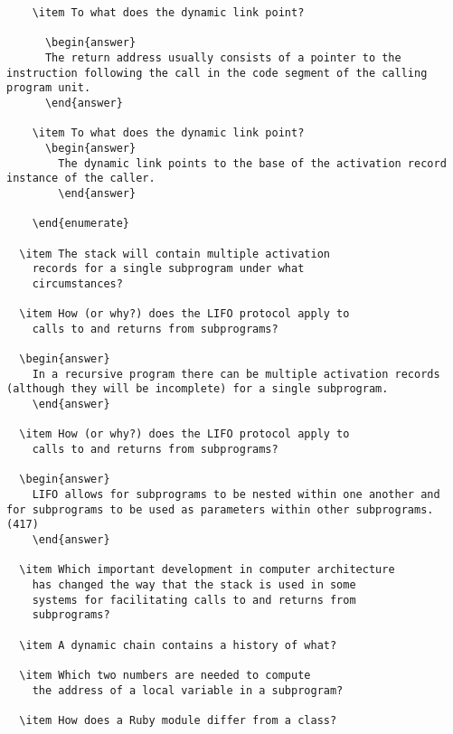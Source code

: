 \begin{enumerate}
\begin{answer}
\begin{lstlisting}
    \item To what does the dynamic link point?

      \begin{answer}
      The return address usually consists of a pointer to the instruction following the call in the code segment of the calling program unit.
      \end{answer}

    \item To what does the dynamic link point?
      \begin{answer}
        The dynamic link points to the base of the activation record instance of the caller.
        \end{answer}

    \end{enumerate}

  \item The stack will contain multiple activation
    records for a single subprogram under what
    circumstances?

  \item How (or why?) does the LIFO protocol apply to
    calls to and returns from subprograms?

  \begin{answer}
    In a recursive program there can be multiple activation records (although they will be incomplete) for a single subprogram.
    \end{answer}

  \item How (or why?) does the LIFO protocol apply to
    calls to and returns from subprograms?
  
  \begin{answer}
    LIFO allows for subprograms to be nested within one another and for subprograms to be used as parameters within other subprograms. (417)
    \end{answer}

  \item Which important development in computer architecture
    has changed the way that the stack is used in some
    systems for facilitating calls to and returns from
    subprograms?

  \item A dynamic chain contains a history of what?

  \item Which two numbers are needed to compute
    the address of a local variable in a subprogram?

  \item How does a Ruby module differ from a class?


\end{lstlisting}
\end{answer}
\end{enumerate}
